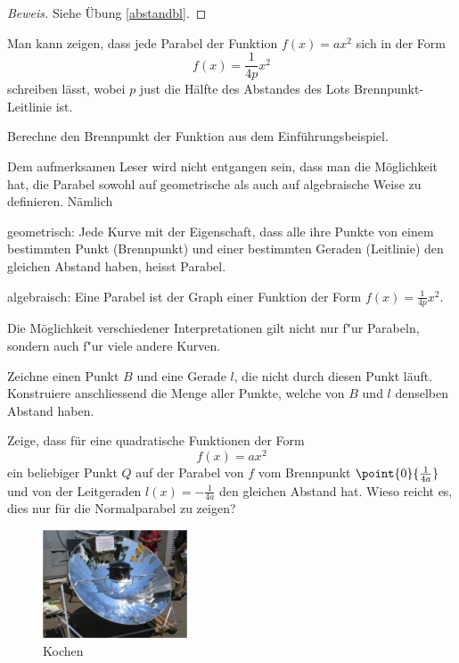 \documentclass[%
11pt,%
twoside,%
titlepage,%
german,%
headsepline%
]{scrartcl}
\begin{document}
\begin{proof}[Beweis]
Siehe \"Ubung \ref{abstandbl}.
\end{proof}

Man kann zeigen, dass jede Parabel der Funktion $f(x)=ax^2$ sich in der Form
$$f(x) = \frac{1}{4p}x^2$$
schreiben l\"asst, wobei $p$ just die H\"alfte des Abstandes des Lots Brennpunkt-Leitlinie ist.

\begin{ueb}[Brennpunkt]
Berechne den Brennpunkt der Funktion aus dem Ein\-f\"uh\-rungs\-bei\-spiel.
\end{ueb}

\begin{bem}
Dem
aufmerksamen Leser wird nicht entgangen sein, dass man die M\"og\-lich\-keit hat, die Parabel sowohl auf geometrische als auch auf algebraische Weise zu definieren. N\"amlich
\begin{description}
\item geometrisch: Jede Kurve mit der Eigenschaft, dass alle ihre Punkte von einem bestimmten Punkt (Brennpunkt) und einer bestimmten Geraden (Leitlinie) den gleichen Abstand haben, heisst Parabel.
\item algebraisch: Eine Parabel ist der Graph einer Funktion der Form $f(x)=\frac{1}{4p}x^2$.
\end{description}
Die M\"oglichkeit verschiedener Interpretationen gilt nicht nur f"ur Parabeln, sondern auch f"ur viele andere Kurven.
\end{bem}

\begin{ueb}[Geometrie]
Zeichne einen Punkt $B$ und eine Gerade $l$, die nicht durch diesen Punkt l\"auft. Konstruiere anschliessend die Menge aller Punkte, welche von $B$ und $l$ denselben Abstand haben.
\end{ueb}

\begin{ueb}
 \label{abstandbl}
Zeige,
dass f\"ur eine quadratische Funktionen der Form
$$f(x)=ax^2$$
ein beliebiger Punkt $Q$ auf der Parabel von $f$ vom Brennpunkt $\point{0}{\frac{1}{4a}}$ und von der Leitgeraden $l(x)=-\frac{1}{4a}$ den gleichen Abstand hat.
Wieso reicht es, dies nur f\"ur die Normalparabel zu zeigen?
\end{ueb}

\begin{figure}
\centering
\includegraphics[width=0.382\textwidth]{pictures/herd}
\caption{Kochen}
\end{figure}
\end{document}
